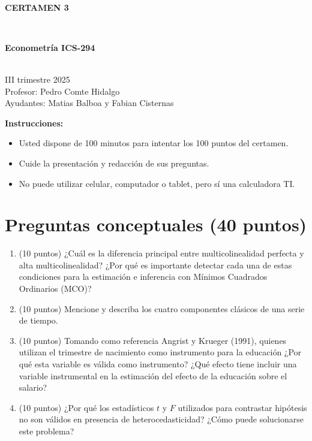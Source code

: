 \documentclass[10pt,a4paper]{article}
\begin{document}
\vspace{5cm}



\begin{center}
\begin{large}
\textbf{\\CERTAMEN 3}
\end{large}\\
\end{center}

\begin{center}
\begin{large}
\textbf{Econometría ICS-294}
\end{large}\\
\vspace{0.2cm}
III trimestre 2025\\
Profesor: Pedro Comte Hidalgo\\
Ayudantes: Matias Balboa y Fabian Cisternas
\end{center}

\textbf{Instrucciones:} 

\begin{itemize}

    \item Usted dispone de 100 minutos  para intentar los 100 puntos del certamen.
    \item Cuide la presentación y redacción de sus preguntas.
    \item No puede utilizar celular, computador o tablet, pero sí una calculadora TI.
     
\end{itemize}

\section{Preguntas conceptuales (40 puntos)}

\begin{enumerate}

\item (10 puntos) ¿Cuál es la diferencia principal entre multicolinealidad perfecta y alta multicolinealidad?
¿Por qué es importante detectar cada una de estas condiciones para la estimación e inferencia con Mínimos Cuadrados Ordinarios (MCO)?


\item (10 puntos) Mencione y describa los cuatro componentes clásicos de una serie de tiempo.


\item (10 puntos) Tomando como referencia Angrist y Krueger (1991), quienes utilizan el trimestre de nacimiento como instrumento para la educación ¿Por qué esta variable es válida como instrumento? ¿Qué efecto tiene incluir una variable instrumental en la estimación del efecto de la educación sobre el salario?


\item (10 puntos) ¿Por qué los estadísticos \(t\) y \(F\) utilizados para contrastar hipótesis no son válidos en presencia de heterocedasticidad?
¿Cómo puede solucionarse este problema?

\end{enumerate}
\end{document}
